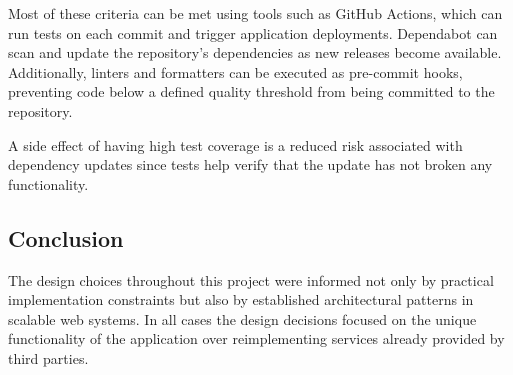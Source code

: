Most of these criteria can be met using tools such as GitHub Actions, which can run tests on each commit and trigger application deployments. Dependabot can scan and update the repository’s dependencies as new releases become available. Additionally, linters and formatters can be executed as pre-commit hooks, preventing code below a defined quality threshold from being committed to the repository.

A side effect of having high test coverage is a reduced risk associated with dependency updates since tests help verify that the update has not broken any functionality.

\subsection{Conclusion}
The design choices throughout this project were informed not only by practical implementation constraints but also by established architectural patterns in scalable web systems. In all cases the design decisions focused on the unique functionality of the application over reimplementing services already provided by third parties.
